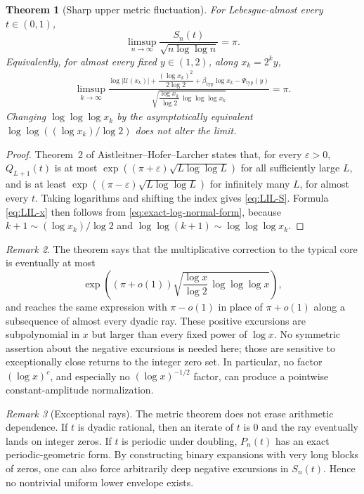 \documentclass[11pt,oneside]{article}
\newtheorem{theorem}{Theorem}[section]
\theoremstyle{definition}
\theoremstyle{remark}
\newtheorem{remark}[theorem]{Remark}
\newcommand{\Uhat}{\mathcal U}
\begin{document}
\begin{theorem}[Sharp upper metric fluctuation]\label{thm:lil}
For Lebesgue-almost every $t\in(0,1)$,
\begin{equation}\label{eq:LIL-S}
 \limsup_{n\to\infty}
 \frac{S_n(t)}{\sqrt{n\log\log n}}=\pi.
\end{equation}
Equivalently, for almost every fixed $y\in(1,2)$, along $x_k=2^ky$,
\begin{multline}\label{eq:LIL-x}
 \limsup_{k\to\infty}
 \frac{
 \log|\Uhat(x_k)|
 +\dfrac{(\log x_k)^2}{2\log2}
 +\beta_{\mathrm{typ}}\log x_k
 -\Psi_{\mathrm{typ}}(y)
 }
 {\sqrt{\dfrac{\log x_k}{\log2}\,
 \log\log\log x_k}}
 =\pi.
\end{multline}
Changing $\log\log\log x_k$ by the asymptotically equivalent
$\log\log((\log x_k)/\log2)$ does not alter the limit.
\end{theorem}

\begin{proof}
Theorem~2 of Aistleitner--Hofer--Larcher states that, for every $\varepsilon>0$,
$Q_{L+1}(t)$ is at most
$\exp((\pi+\varepsilon)\sqrt{L\log\log L})$ for all sufficiently large $L$, and is
at least $\exp((\pi-\varepsilon)\sqrt{L\log\log L})$ for infinitely many $L$,
for almost every $t$.  Taking logarithms and shifting the index gives
\eqref{eq:LIL-S}.  Formula \eqref{eq:LIL-x} then follows from
\eqref{eq:exact-log-normal-form}, because $k+1\sim(\log x_k)/\log2$ and
$\log\log(k+1)\sim\log\log\log x_k$.
\end{proof}

\begin{remark}
The theorem says that the multiplicative correction to the typical core is eventually
at most
\[
 \exp\!\left((\pi+o(1))
 \sqrt{\frac{\log x}{\log2}\,\log\log\log x}\right),
\]
and reaches the same expression with $\pi-o(1)$ in place of $\pi+o(1)$ along a
subsequence of almost every dyadic ray.  These positive excursions are subpolynomial in
$x$ but larger than every fixed power of $\log x$.  No symmetric assertion about the
negative excursions is needed here; those are sensitive to exceptionally close returns to
the integer zero set.  In particular, no factor $(\log x)^c$, and especially no
$(\log x)^{-1/2}$ factor, can produce a pointwise constant-amplitude normalization.
\end{remark}

\begin{remark}[Exceptional rays]
The metric theorem does not erase arithmetic dependence.  If $t$ is dyadic rational,
then an iterate of $t$ is $0$ and the ray eventually lands on integer zeros.  If $t$ is
periodic under doubling, $P_n(t)$ has an exact periodic-geometric form.  By constructing
binary expansions with very long blocks of zeros, one can also force arbitrarily deep
negative excursions in $S_n(t)$.  Hence no nontrivial uniform lower envelope exists.
\end{remark}
\end{document}
